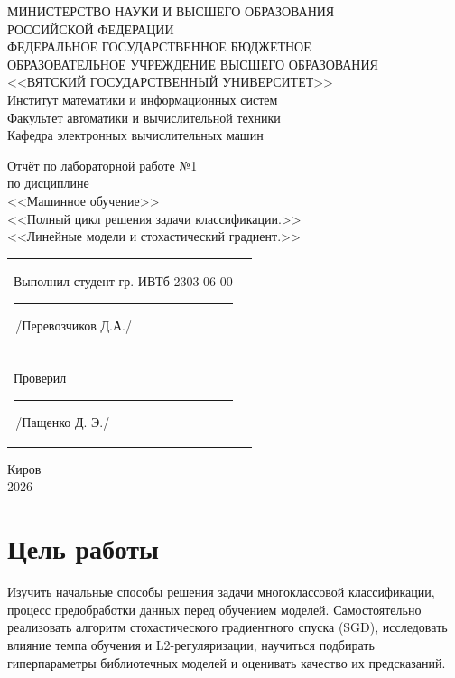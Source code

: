\documentclass[oneside,a4paper,14pt]{extarticle}
\begin{document}
\newpage\thispagestyle{empty}
\begin{center}
	МИНИСТЕРСТВО НАУКИ И ВЫСШЕГО ОБРАЗОВАНИЯ\\
	РОССИЙСКОЙ ФЕДЕРАЦИИ\\
	ФЕДЕРАЛЬНОЕ ГОСУДАРСТВЕННОЕ БЮДЖЕТНОЕ\\
	ОБРАЗОВАТЕЛЬНОЕ УЧРЕЖДЕНИЕ ВЫСШЕГО ОБРАЗОВАНИЯ\\
	<<ВЯТСКИЙ ГОСУДАРСТВЕННЫЙ УНИВЕРСИТЕТ>>\\
	Институт математики и информационных систем\\
	Факультет автоматики и вычислительной техники\\
	Кафедра электронных вычислительных машин
\end{center}
\vspace{30mm}

\begin{center}
	Отчёт по лабораторной работе №1\\
	по дисциплине\\
	<<Машинное обучение>>\\
	<<Полный цикл решения задачи классификации.>>\\
	<<Линейные модели и стохастический градиент.>>\\
\end{center}
\vspace{40mm}

\noindent
\begin{tabular}{l r}
	Выполнил студент гр. ИВТб-2303-06-00 \hspace{10mm} \rule[-1mm]{20mm}{0.15mm}\,/Перевозчиков Д.А./ \\ \\
	Проверил \hspace{65mm} \rule[-1mm]{20mm}{0.15mm}\,/Пащенко Д. Э./
\end{tabular}

\vfill
\begin{center}
	Киров\\
	2026
\end{center}

\newpage

\section{Цель работы}
Изучить начальные способы решения задачи многоклассовой классификации, процесс предобработки данных перед обучением моделей. Самостоятельно реализовать алгоритм стохастического градиентного спуска (SGD), исследовать влияние темпа обучения и L2-регуляризации, научиться подбирать гиперпараметры библиотечных моделей и оценивать качество их предсказаний.
\end{document}

